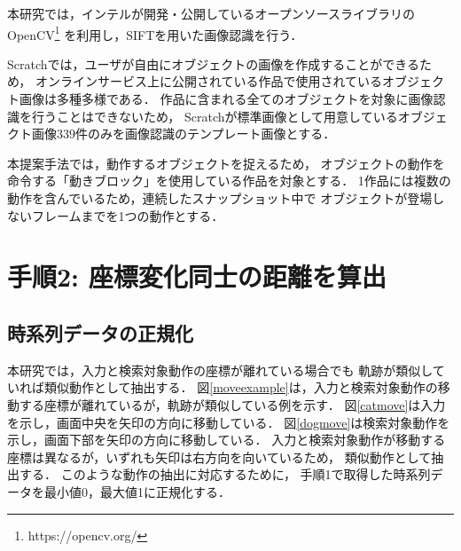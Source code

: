 \documentclass[11pt]{jreport}
\begin{document}
本研究では，インテルが開発・公開しているオープンソースライブラリのOpenCV\footnote{https://opencv.org/}
を利用し，SIFTを用いた画像認識を行う．

Scratchでは，ユーザが自由にオブジェクトの画像を作成することができるため，
オンラインサービス上に公開されている作品で使用されているオブジェクト画像は多種多様である．
作品に含まれる全てのオブジェクトを対象に画像認識を行うことはできないため，
Scratchが標準画像として用意しているオブジェクト画像339件のみを画像認識のテンプレート画像とする．

本提案手法では，動作するオブジェクトを捉えるため，
オブジェクトの動作を命令する「動きブロック」を使用している作品を対象とする．
1作品には複数の動作を含んでいるため，連続したスナップショット中で
オブジェクトが登場しないフレームまでを1つの動作とする．


\section{手順2: 座標変化同士の距離を算出}

\subsection{時系列データの正規化}
本研究では，入力と検索対象動作の座標が離れている場合でも
軌跡が類似していれば類似動作として抽出する．
図\ref{moveexample}は，入力と検索対象動作の移動する座標が離れているが，軌跡が類似している例を示す．
図\ref{catmove}は入力を示し，画面中央を矢印の方向に移動している．
図\ref{dogmove}は検索対象動作を示し，画面下部を矢印の方向に移動している．
入力と検索対象動作が移動する座標は異なるが，いずれも矢印は右方向を向いているため，
類似動作として抽出する．
このような動作の抽出に対応するために，
手順1で取得した時系列データを最小値0，最大値1に正規化する．
\end{document}
